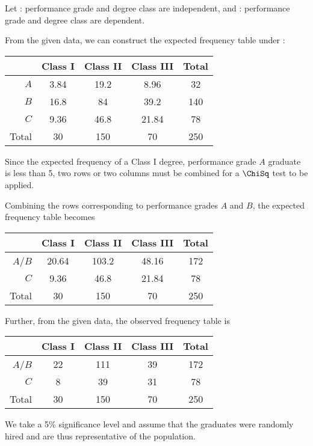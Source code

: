 \begin{solution}
    \begin{ppart}
        Let \nullhyp: performance grade and degree class are independent, and \althyp: performance grade and degree class are dependent.

        From the given data, we can construct the expected frequency table under \nullhyp:
        \begin{table}[H]
            \centering
            \begin{tabular}{|r|c|c|c|c|}
            \hline
             & Class I & Class II & Class III & Total \\ \hline
            $A$ & 3.84 & 19.2 & 8.96 & 32 \\ \hline
            $B$ & 16.8 & 84 & 39.2 & 140 \\ \hline
            $C$ & 9.36 & 46.8 & 21.84 & 78 \\ \hline
            Total & 30 & 150 & 70 & 250 \\ \hline
            \end{tabular}
        \end{table}
        Since the expected frequency of a Class I degree, performance grade $A$ graduate is less than 5, two rows or two columns must be combined for a $\ChiSq$ test to be applied.
    \end{ppart}
    \begin{ppart}
        Combining the rows corresponding to performance grades $A$ and $B$, the expected frequency table becomes
        \begin{table}[H]
            \centering
            \begin{tabular}{|r|c|c|c|c|}
            \hline
             & Class I & Class II & Class III & Total \\ \hline
            $A$/$B$ & 20.64 & 103.2 & 48.16 & 172 \\ \hline
            $C$ & 9.36 & 46.8 & 21.84 & 78 \\ \hline
            Total & 30 & 150 & 70 & 250 \\ \hline
            \end{tabular}
        \end{table}
        Further, from the given data, the observed frequency table is
        \begin{table}[H]
            \centering
            \begin{tabular}{|r|c|c|c|c|}
            \hline
             & Class I & Class II & Class III & Total \\ \hline
            $A$/$B$ & 22 & 111 & 39 & 172 \\ \hline
            $C$ & 8 & 39 & 31 & 78 \\ \hline
            Total & 30 & 150 & 70 & 250 \\ \hline
            \end{tabular}
        \end{table}
        We take a 5\% significance level and assume that the graduates were randomly hired and are thus representative of the population.
        

\end{ppart}
\end{solution}
